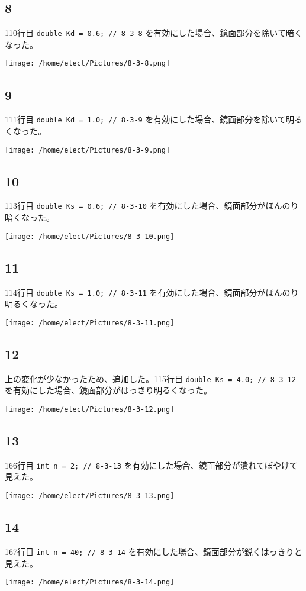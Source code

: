 \documentclass{scrartcl}
\begin{document}
\subsection{8}
\label{sec:orgb3f828f}
110行目 \texttt{double Kd = 0.6;  // 8-3-8} を有効にした場合、鏡面部分を除いて暗くなった。\\
\begin{center}
\texttt{[image: /home/elect/Pictures/8-3-8.png]}
\end{center}
\subsection{9}
\label{sec:org9fd1e70}
111行目 \texttt{double Kd = 1.0;  // 8-3-9} を有効にした場合、鏡面部分を除いて明るくなった。\\
\begin{center}
\texttt{[image: /home/elect/Pictures/8-3-9.png]}
\end{center}
\subsection{10}
\label{sec:orgc4de23f}
113行目 \texttt{double Ks = 0.6;  // 8-3-10} を有効にした場合、鏡面部分がほんのり暗くなった。\\
\begin{center}
\texttt{[image: /home/elect/Pictures/8-3-10.png]}
\end{center}
\subsection{11}
\label{sec:org4f11839}
114行目 \texttt{double Ks = 1.0;  // 8-3-11} を有効にした場合、鏡面部分がほんのり明るくなった。\\
\begin{center}
\texttt{[image: /home/elect/Pictures/8-3-11.png]}
\end{center}
\subsection{12}
\label{sec:orgc818898}
上の変化が少なかったため、追加した。115行目 \texttt{double Ks = 4.0;  // 8-3-12} を有効にした場合、鏡面部分がはっきり明るくなった。\\
\begin{center}
\texttt{[image: /home/elect/Pictures/8-3-12.png]}
\end{center}
\subsection{13}
\label{sec:orgfb20a66}
166行目 \texttt{int n = 2; // 8-3-13} を有効にした場合、鏡面部分が潰れてぼやけて見えた。\\
\begin{center}
\texttt{[image: /home/elect/Pictures/8-3-13.png]}
\end{center}
\subsection{14}
\label{sec:orgf48208c}
167行目 \texttt{int n = 40; // 8-3-14} を有効にした場合、鏡面部分が鋭くはっきりと見えた。\\
\begin{center}
\texttt{[image: /home/elect/Pictures/8-3-14.png]}
\end{center}
\end{document}
